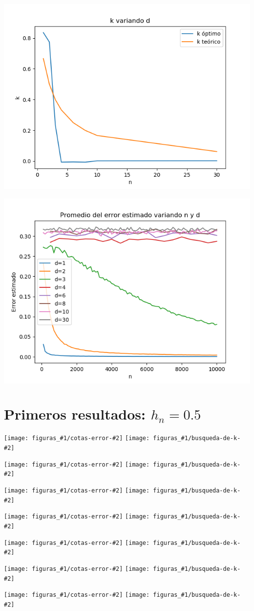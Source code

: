 \documentclass[12pt, a4paper]{article}
\newcommand{\imagenesDH}[2]{
  \texttt{[image: figuras\_\#1/cotas-error-\#2]}
  \texttt{[image: figuras\_\#1/busqueda-de-k-\#2]}
}
\begin{document}
\includegraphics[width=\textwidth]{figuras_h=0.1/k-variando-d}

\includegraphics[width=\textwidth]{figuras_h=0.1/resultados-grales}


\section{Primeros resultados: $h_n=0.5$}

\imagenesDH{h=0.1}{d=1}
\imagenesDH{h=0.5}{d=2}
\imagenesDH{h=0.5}{d=3}
\imagenesDH{h=0.5}{d=4}
\imagenesDH{h=0.5}{d=6}
\imagenesDH{h=0.5}{d=8}
\imagenesDH{h=0.5}{d=10}
\end{document}
